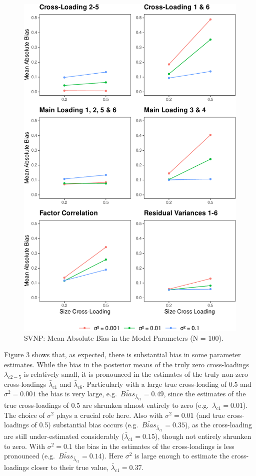 \documentclass[
  man, donotrepeattitle,floatsintext]{apa6}
\begin{document}
\begin{figure}
\centering
\includegraphics{JMBKoch_thesis_files/figure-latex/unnamed-chunk-3-1.pdf}
\caption{\label{fig:unnamed-chunk-3}SVNP: Mean Absolute Bias in the Model Parameters (N = 100).}
\end{figure}

Figure 3 shows that, as expected, there is substantial bias in some parameter estimates. While the bias in the posterior means of the truly zero cross-loadings \(\bar{\lambda}_{c 2-5}\) is relatively small, it is pronounced in the estimates of the truly non-zero cross-loadings \(\bar{\lambda}_{c 1}\) and \(\bar{\lambda}_{c 6}\). Particularly with a large true cross-loading of 0.5 and \(\sigma^2 = 0.001\) the bias is very large, e.g.~\(\bar{Bias}_{\bar{\lambda}_{c 1}} = 0.49\), since the estimates of the true cross-loadings of 0.5 are shrunken almost entirely to zero (e.g.~\(\bar{\lambda}_{c 1} = 0.01\)). The choice of \(\sigma^2\) plays a crucial role here. Also with \(\sigma^2 = 0.01\) (and true cross-loadings of 0.5) substantial bias occurs (e.g.~\(\bar{Bias}_{\bar{\lambda}_{c 1}} = 0.35\)), as the cross-loading are still under-estimated considerably (\(\bar{\lambda}_{c 1} = 0.15\)), though not entirely shrunken to zero. With \(\sigma^2 = 0.1\) the bias in the estimates of the cross-loadings is less pronounced (e.g.~\(\bar{Bias}_{\bar{\lambda}_{c 1}} = 0.14\)). Here \(\sigma^2\) is large enough to estimate the cross-loadings closer to their true value, \(\bar{\lambda}_{c 1} = 0.37\).
\end{document}
